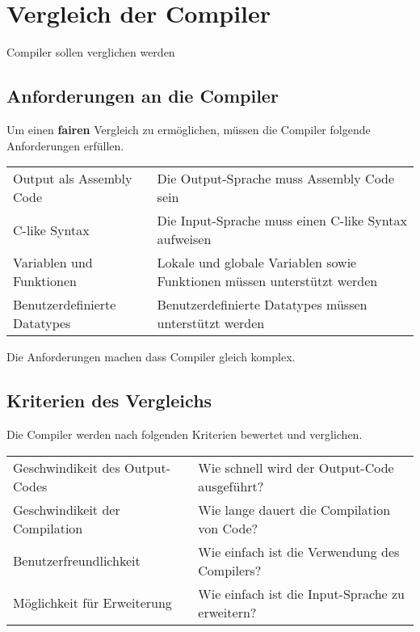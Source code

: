 \chapter{Vergleich der Compiler}
Compiler sollen verglichen werden
\section{Anforderungen an die Compiler}
Um einen \textbf{fairen} Vergleich zu ermöglichen, müssen die Compiler folgende Anforderungen erfüllen.

\begin{table}[h]
    \begin{tabular}{l|l}
    Output als Assembly Code     & Die Output-Sprache muss Assembly Code sein                               \\
    C-like Syntax                & Die Input-Sprache muss einen C-like Syntax aufweisen                     \\
    Variablen und Funktionen     & Lokale und globale Variablen sowie Funktionen müssen unterstützt werden  \\
    Benutzerdefinierte Datatypes & Benutzerdefinierte Datatypes müssen unterstützt werden                                 
    \end{tabular}
\end{table}

Die Anforderungen machen dass Compiler gleich komplex.

\section{Kriterien des Vergleichs}
Die Compiler werden nach folgenden Kriterien bewertet und verglichen.

\begin{table}[h!]
    \begin{tabular}{l|l}
    Geschwindikeit des Output-Codes     & Wie schnell wird der Output-Code ausgeführt?                      \\
    Geschwindikeit der Compilation      & Wie lange dauert die Compilation von Code?                        \\
    Benutzerfreundlichkeit              & Wie einfach ist die Verwendung des Compilers?                     \\
    Möglichkeit für Erweiterung         & Wie einfach ist die Input-Sprache zu erweitern?                                 
    \end{tabular}
\end{table}

